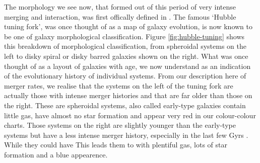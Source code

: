 
The morphology we see now, that formed out of this period of very intense merging and interaction, was first offically defined in \citet{1936rene.book.....H}. The famous `Hubble tuning fork', was once thought of as a map of galaxy evolution, is now known to be one of galaxy morphological classification. Figure \ref{fig:hubble-tuning} shows this breakdown of morphological classification, from spheroidal systems on the left to disky spiral or disky barred galaxies shown on the right. What was once thought of as a layout of galaxies with age, we now understand as an indication of the evolutionary history of individual systems. From our description here of merger rates, we realise that the systems on the left of the tuning fork are actually those with intense merger histories and that are far older than those on the right. These are spheroidal systems, also called early-type galaxies contain little gas, have almost no star formation and appear very red in our colour-colour charts. Those systems on the right are slightly younger than the early-type systems but have a less intense merger history, especially in the last few Gyrs \citep{}. While they could have This leads them to with plentiful gas, lots of star formation and a blue appearence.

